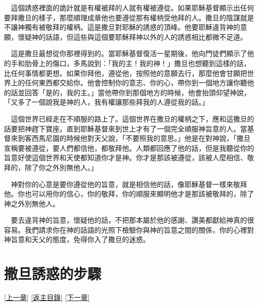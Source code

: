 \documentclass{book}
\begin{document}
　這個誘惑裡面的詭計就是有權被拜的人就有權被遵從。如果耶穌基督顯示出任何要拜撒旦的樣子，那麼順理成章他也要遵從那有權柄受他拜的人。撒旦的陰謀就是不讓神獨有被敬拜的權柄。這是撒旦對耶穌的誘惑的頂峰。他要耶穌違背神的意願，懷疑神的話語，但這些與這個要耶穌拜神以外的人的誘惑相比都微不足道。

　這是撒旦最想從你那裡得到的。當耶穌基督復活一星期後，他向門徒們顯示了他的手和肋骨上的傷口，多馬說到：「我的主！我的神！」撒旦也想聽到這樣的話，比任何事情都更想。如果你拜他，遵從他，按照他的意願去行，那麼他會甘願把世界上的任何東西都交給你。他會控制你的意志、你的心，帶你到一個地方讓你聽他的話並回答「是的，我的主。」當他帶你到那個地方的時候，他會抬頭仰望神說，「又多了一個說我是神的人，我有權讓那些拜我的人遵從我的話。」

　這個世界已經走在不順服的路上了。這個世界在撒旦的權柄之下，應和這撒旦的話要把神趕下寶座。直到耶穌基督來到世上才有了一個完全順服神旨意的人。當基督來到客西馬尼園的時候他對天父說，「不要照我的意思。」他是在對神說，「撒旦宣稱要被遵從，要人們都信他，都敬拜他。人類都回應了他的話，但是我聽從你的旨意好使這個世界和天使都知道你才是神。你才是那該被遵從，該被人麼相信、敬拜的，除了你之外別無他人。」

　神對你的心意是要你遵從他的旨意，就是相信他的話，像耶穌基督一樣來敬拜他。你也可以用你的信心，你的敬拜，你的順服來顯明他才是那該被敬拜的，除了神之外別無他人。

　要去違背神的旨意，懷疑他的話，不把那本屬於他的感謝、讚美都獻給神真的很容易。我們請求你在神的話語的光照下檢驗你與神的旨意之間的關係，你的心裡對神旨意和天父的態度，免得你入了撒旦的迷惑。

\chapter{撒旦誘惑的步驟}
\label{sec:ch14}
\hyperref[sec:ch13]{[上一章]}
\hyperlink{toc}{[返主目錄]}
\hyperref[sec:ch15]{[下一章]}

\begin{center}
\noindent{}
\end{center}
\end{document}
